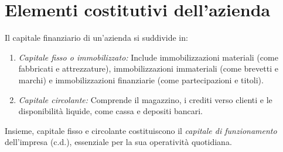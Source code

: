 \section{Elementi costitutivi dell’azienda}
Il capitale finanziario di un’azienda si suddivide in:
\begin{enumerate}
    \item \textit{Capitale fisso o immobilizzato:} Include immobilizzazioni materiali (come fabbricati e attrezzature), immobilizzazioni immateriali (come brevetti e marchi) e immobilizzazioni finanziarie (come partecipazioni e titoli).
    \item \textit{Capitale circolante:} Comprende il magazzino, i crediti verso clienti e le disponibilità liquide, come cassa e depositi bancari.
\end{enumerate}
Insieme, capitale fisso e circolante costituiscono il \textit{capitale di funzionamento} dell’impresa (c.d.), essenziale per la sua operatività quotidiana.